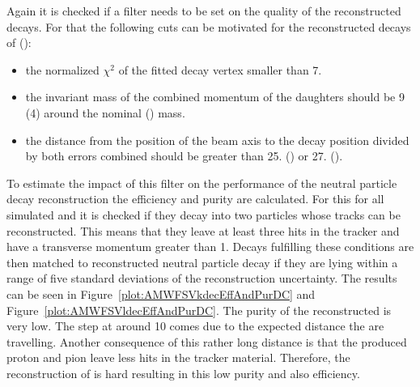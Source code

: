 Again it is checked if a filter needs to be set on the quality of the reconstructed decays. For that the following cuts can be motivated for the reconstructed decays of \PKzS{} (\PgL{})\cite{v0paper}:
\begin{itemize}
\item the normalized $\chi^{2}$ of the fitted decay vertex smaller than 7.
\item the invariant mass of the combined momentum of the daughters should be 9\MeVcc{} (4\MeVcc{}) around the nominal \PKzS{} (\PgL{}) mass.
\item the distance from the position of the beam axis to the decay position divided by both errors combined should be greater than 25. (\PKzS{}) or 27.  (\PgL{}).
\end{itemize}
To estimate the impact of this filter on the performance of the neutral particle decay reconstruction the efficiency and purity are calculated. For this for all simulated \PKzS{} and \PgL{} it is checked if they decay into two particles whose tracks can be reconstructed. This means that they leave at least three hits in the tracker and have a transverse momentum greater than 1\GeV. Decays fulfilling these conditions are then matched to reconstructed neutral particle decay if they are lying within a range of five standard deviations of the reconstruction uncertainty. The results can be seen in Figure~\ref{plot:AMWFSVkdecEffAndPurDC} and Figure~\ref{plot:AMWFSVldecEffAndPurDC}. The purity of the reconstructed \PgL{} is very low. The step at around 10\cm{} comes due to the expected distance the \PgL{} are travelling. Another consequence of this rather long distance is that the produced proton and pion leave less hits in the tracker material. Therefore, the reconstruction of \PgL{} is hard resulting in this low purity and also efficiency.

